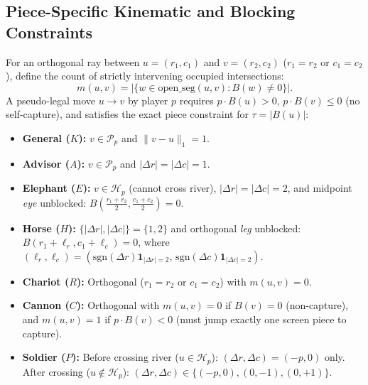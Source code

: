 \documentclass[conference]{IEEEtran}
\begin{document}
\subsection{Piece-Specific Kinematic and Blocking Constraints}
For an orthogonal ray between $u=(r_1,c_1)$ and $v=(r_2,c_2)$ ($r_1=r_2$ or $c_1=c_2$), define the count of strictly intervening occupied intersections:
\begin{equation}
m(u, v) = \big|\{ w \in \mathrm{open\_seg}(u, v) : B(w) \neq 0 \}\big|.
\end{equation}
A pseudo-legal move $u \to v$ by player $p$ requires $p\cdot B(u) > 0$, $p\cdot B(v) \le 0$ (no self-capture), and satisfies the exact piece constraint for $\tau = |B(u)|$:
\begin{itemize}
    \item \textbf{General ($K$):} $v \in \mathcal{P}_p$ and $\|v - u\|_1 = 1$.
    \item \textbf{Advisor ($A$):} $v \in \mathcal{P}_p$ and $|\Delta r| = |\Delta c| = 1$.
    \item \textbf{Elephant ($E$):} $v \in \mathcal{H}_p$ (cannot cross river), $|\Delta r|=|\Delta c|=2$, and midpoint \emph{eye} unblocked: $B\!\left(\frac{r_1+r_2}{2}, \frac{c_1+c_2}{2}\right)=0$.
    \item \textbf{Horse ($H$):} $\{|\Delta r|, |\Delta c|\}=\{1,2\}$ and orthogonal \emph{leg} unblocked: $B(r_1+\ell_r, c_1+\ell_c)=0$, where $(\ell_r,\ell_c)=(\mathrm{sgn}(\Delta r)\mathbf{1}_{|\Delta r|=2},\,\mathrm{sgn}(\Delta c)\mathbf{1}_{|\Delta c|=2})$.
    \item \textbf{Chariot ($R$):} Orthogonal ($r_1=r_2$ or $c_1=c_2$) with $m(u,v)=0$.
    \item \textbf{Cannon ($C$):} Orthogonal with $m(u,v)=0$ if $B(v)=0$ (non-capture), and \textbf{$m(u,v)=1$} if $p\cdot B(v)<0$ (must jump exactly one screen piece to capture).
    \item \textbf{Soldier ($P$):} Before crossing river ($u \in \mathcal{H}_p$): $(\Delta r, \Delta c) = (-p, 0)$ only. After crossing ($u \notin \mathcal{H}_p$): $(\Delta r, \Delta c) \in \{(-p,0),(0,-1),(0,+1)\}$.
\end{itemize}
\end{document}
